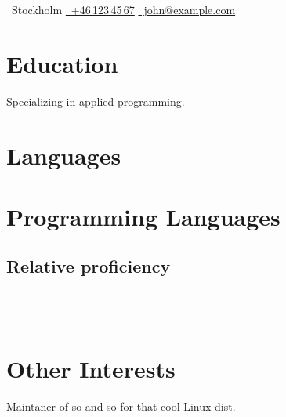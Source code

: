 \documentclass{linderothcv}
\begin{document}
\begin{lcvheader}[name=John Smith]
    \centerline{
        \sffamily
        \faMapMarker~Stockholm\hspace{1em}
        \href{tel:+461234567}{\faPhone~+46\,123\,45\,67}\hspace{1em}
        \href{mailto:john@example.com}{\faAt~john@example.com}
    }
\end{lcvheader}


\begin{lcvleftcolumn}

\section{Education}

Specializing in applied programming.

\section{Languages}



\section{Programming Languages}
\subsection{Relative proficiency}

 \\
 \\

\section{Other Interests}

Maintaner of so-and-so for that cool Linux dist.


\end{lcvleftcolumn}
\end{document}
